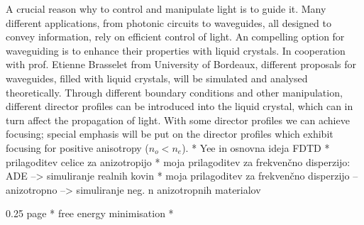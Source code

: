 \documentclass[a4paper,10pt]{article}
\begin{document}
A crucial reason why to control and manipulate light is to guide it. 
Many different applications, from photonic circuits to waveguides, all designed to convey information, rely on efficient control of light. 
An compelling option for waveguiding is to enhance their properties with liquid crystals. 
In cooperation with prof. Etienne Brasselet from University of Bordeaux, different proposals for waveguides, filled with liquid crystals, will be simulated and analysed theoretically. 
Through different boundary conditions and other manipulation, different director profiles can be introduced into the liquid crystal, which can in turn affect the propagation of light. 
With some director profiles we can achieve focusing; special emphasis will be put on the director profiles which exhibit focusing for positive anisotropy ($n_{o} < n_e$).
% 
%
%
%
%
% 
% 
%
%
%
* Yee in osnovna ideja FDTD
* prilagoditev celice za anizotropijo
* moja prilagoditev za frekvenčno disperzijo: ADE --> simuliranje realnih kovin
* moja prilagoditev za frekvenčno disperzijo -- anizotropno --> simuliranje neg. n anizotropnih materialov

0.25 page
* free energy minimisation
* 
% 
%
%
%
%
%
%



\end{document}

